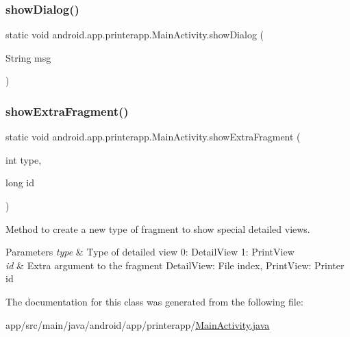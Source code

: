 \mbox{\label{classandroid_1_1app_1_1printerapp_1_1_main_activity_a0e0e8254b3455ef2947635e2f6350aa1}} 
\subsubsection{\texorpdfstring{show\+Dialog()}{showDialog()}}
{\footnotesize\ttfamily static void android.\+app.\+printerapp.\+Main\+Activity.\+show\+Dialog (\begin{DoxyParamCaption}\item[{String}]{msg }\end{DoxyParamCaption})\hspace{0.3cm}{\ttfamily [static]}}

\mbox{\label{classandroid_1_1app_1_1printerapp_1_1_main_activity_a3605c952ef647e7ffc2d27041af3f722}} 
\subsubsection{\texorpdfstring{show\+Extra\+Fragment()}{showExtraFragment()}}
{\footnotesize\ttfamily static void android.\+app.\+printerapp.\+Main\+Activity.\+show\+Extra\+Fragment (\begin{DoxyParamCaption}\item[{int}]{type,  }\item[{long}]{id }\end{DoxyParamCaption})\hspace{0.3cm}{\ttfamily [static]}}

Method to create a new type of fragment to show special detailed views.


\begin{DoxyParams}{Parameters}
{\em type} & Type of detailed view 0\+: Detail\+View 1\+: Print\+View \\
\hline
{\em id} & Extra argument to the fragment Detail\+View\+: File index, Print\+View\+: Printer id \\
\hline
\end{DoxyParams}


The documentation for this class was generated from the following file\+:\begin{DoxyCompactItemize}
\item 
app/src/main/java/android/app/printerapp/\hyperlink{_main_activity_8java}{Main\+Activity.\+java}\end{DoxyCompactItemize}
